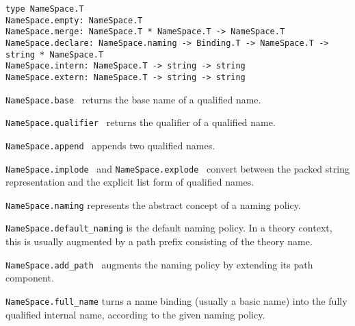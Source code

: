 \begin{isabellebody}
\begin{isamarkuptext}
  \begin{mldecls}
  \verb|type NameSpace.T| \\
  \verb|NameSpace.empty: NameSpace.T| \\
  \verb|NameSpace.merge: NameSpace.T * NameSpace.T -> NameSpace.T| \\
  \verb|NameSpace.declare: NameSpace.naming -> Binding.T -> NameSpace.T -> string * NameSpace.T| \\
  \verb|NameSpace.intern: NameSpace.T -> string -> string| \\
  \verb|NameSpace.extern: NameSpace.T -> string -> string| \\
  \end{mldecls}

  \begin{description}

  \item \verb|NameSpace.base|~ returns the base name of a
  qualified name.

  \item \verb|NameSpace.qualifier|~ returns the qualifier
  of a qualified name.

  \item \verb|NameSpace.append|~
  appends two qualified names.

  \item \verb|NameSpace.implode|~ and \verb|NameSpace.explode|~ convert between the packed string
  representation and the explicit list form of qualified names.

  \item \verb|NameSpace.naming| represents the abstract concept of
  a naming policy.

  \item \verb|NameSpace.default_naming| is the default naming policy.
  In a theory context, this is usually augmented by a path prefix
  consisting of the theory name.

  \item \verb|NameSpace.add_path|~ augments the
  naming policy by extending its path component.

  \item \verb|NameSpace.full_name| turns a name
  binding (usually a basic name) into the fully qualified
  internal name, according to the given naming policy.


\end{description}
\end{isamarkuptext}
\end{isabellebody}

